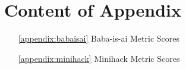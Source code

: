 \appendix

\appendix
\section*{Content of Appendix}
\begin{itemize}[noitemsep, topsep=0pt]
    \item[\ref{appendix:babaisai}] Baba-is-ai Metric Scores
    \item[\ref{appendix:minihack}] Minihack Metric Scores
\end{itemize}


